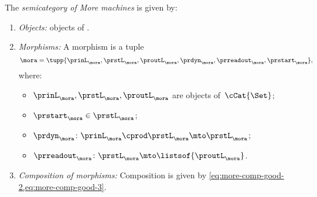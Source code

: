 \begin{definition}[\More]
    \label{def:More}
    The \emph{semicategory of More machines} \More is given by:
    \begin{enumerate}
        \item \emph{Objects:} objects of \cCat{\Set}.
        \item \emph{Morphisms:}
              A morphism is a tuple
              \begin{equation*}
                  \mora = \tupp{\prinL_{\mora},\prstL_{\mora}, \proutL_{\mora},\prdyn_{\mora},\prreadout_{\mora},\prstart_{\mora}},
              \end{equation*}
              where:
              \begin{itemize}
                  \item $\prinL_{\mora},\prstL_{\mora}, \proutL_{\mora}$ are objects of~$\cCat{\Set}$;
                  \item $\prstart_{\mora} \in \prstL_{\mora}$;
                  \item $ \prdyn_{\mora} \colon \prinL_{\mora} \cprod \prstL_{\mora} \mto \prstL_{\mora}$;
                  \item $ \prreadout_{\mora} \colon \prstL_{\mora}  \mto \listsof{\proutL_{\mora}}$.
              \end{itemize}
        \item \emph{Composition of morphisms:}
              Composition is given by \cref{eq:more-comp-good-2,eq:more-comp-good-3}.
    \end{enumerate}
\end{definition}


